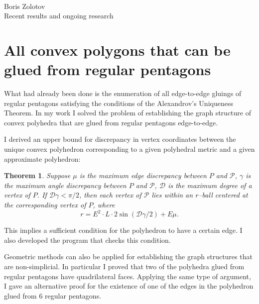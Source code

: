\documentclass[a4paper,11pt]{article}
\newtheorem{theorem}{Theorem}
\theoremstyle{definition}
\begin{document}
\def\P{\mathcal P} \def\Ot{\tilde O}

\begin{center} \ \\ [1.5cm]
	{\Huge Boris Zolotov} \\ [0.35cm]
	{Recent results and ongoing research}
\end{center}

\section{All convex polygons that can be glued from regular pentagons}


What had already been done is the enumeration of all edge-to-edge gluings of regular pentagons satisfying the conditions of the Alexandrov's Uniqueness Theorem. In my work I solved the problem of establishing the graph structure of convex polyhedra that are glued from regular pentagons edge-to-edge.

I derived an upper bound for discrepancy in vertex coordinates between the unique convex polyhedron corresponding to a given polyhedral metric and a given approximate polyhedron:


\begin{theorem} \label{precision}
	Suppose $\mu$ is the maximum edge discrepancy between $P$ and $\P$, $\gamma$ is the maximum angle discrepancy between $P$ and $\P$, $\mathcal D$ is the maximum degree of a vertex of $P$. If $\mathcal D \gamma < \pi / 2$, then each vertex of $\P$ lies within an $r$--ball centered at the corresponding vertex of $P$, where
\begin{equation}
	r = E^2 \cdot  L \cdot 2 \sin ( \mathcal D \gamma / 2 ) + E \mu.
\end{equation} \end{theorem}

This implies a sufficient condition for the polyhedron to have a certain edge. I also developed the program that checks this condition.

Geometric methods can also be applied for establishing the graph structures that are non-simplicial. In particular I proved that two of the polyhedra glued from regular pentagons have quadrilateral faces. Applying the same type of argument, I gave an alternative proof for the existence of one of the edges in the polyhedron glued from 6 regular pentagons.
\end{document}
